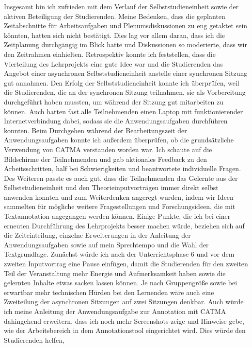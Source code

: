 \documentclass[
          a4paper,
        ]{article}
\begin{document}
Insgesamt bin ich zufrieden mit dem Verlauf der Selbststudieneinheit
sowie der aktiven Beteiligung der Studierenden. Meine Bedenken, dass die
geplanten Zeitabschnitte für Arbeitsaufgaben und Plenumsdiskussionen zu
eng getaktet sein könnten, hatten sich nicht bestätigt. Dies lag vor
allem daran, dass ich die Zeitplanung durchgängig im Blick hatte und
Diskussionen so moderierte, dass wir den Zeitrahmen einhielten.
Retrospektiv konnte ich feststellen, dass die Vierteilung des
Lehrprojekts eine gute Idee war und die Studierenden das Angebot einer
asynchronen Selbststudieneinheit anstelle einer synchronen Sitzung gut
annahmen. Den Erfolg der Selbststudieneinheit konnte ich überprüfen,
weil die Studierenden, die an der synchronen Sitzung teilnahmen, sie als
Vorbereitung durchgeführt haben mussten, um während der Sitzung gut
mitarbeiten zu können. Auch hatten fast alle Teilnehmenden einen Laptop
mit funktionierender Internetverbindung dabei, sodass sie die
Anwendungsaufgaben durchführen konnten. Beim Durchgehen während der
Bearbeitungszeit der Anwendungsaufgaben konnte ich außerdem überprüfen,
ob die grundsätzliche Verwendung von CATMA verstanden worden war. Ich
schaute auf die Bildschirme der Teilnehmenden und gab aktionales
Feedback zu den Arbeitsschritten, half bei Schwierigkeiten und
beantwortete individuelle Fragen. Des Weiteren passte es auch gut, dass
die Teilnehmenden das Gelernte aus der Selbststudieneinheit und den
Theorieinputvorträgen immer direkt selbst anwenden konnten und zum
Weiterdenken angeregt wurden, indem wir Ideen sammelten für mögliche
weitere Fragestellungen und Forschungsideen, die mit Textannotation
angegangen werden können. Einige Punkte, die ich bei einer erneuten
Durchführung des Lehrprojekts besser machen würde, beziehen sich auf die
Zeiteinteilung, einzelne Erweiterungen in der Anleitung der
Anwendungsaufgaben sowie auf mein Sprechtempo und die Wahl der
Textgrundlage. Zunächst würde ich nach der Unterrichtsphase 6 und vor
dem zweiten Inputvortrag eine Pause einfügen, damit die Studierenden für
den zweiten Teil der Veranstaltung mehr Energie und Aufmerksamkeit haben
sowie die gelernten Inhalte etwas sacken lassen können. Je nach
Gruppengröße sowie bei erwartbar mehr technischen Hürden bei den
Lernenden wäre auch eine Zweiteilung der asynchronen Sitzungen auf zwei
Sitzungen denkbar. Auch würde ich meine Anleitung der Anwendungsaufgabe
zur Annotation mit CATMA dahingehend erweitern, dass ich noch mehr
Screenshots zeige und Hinweise gebe, wie der Arbeitsbereich in dem
Annotationstool eingerichtet wird. Dies würde den Studierenden helfen,
\end{document}
